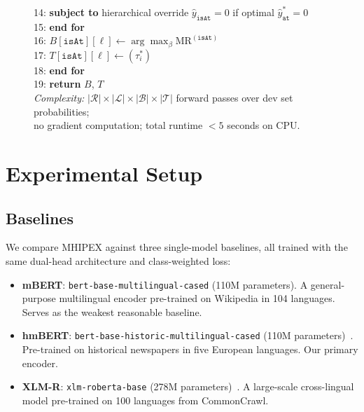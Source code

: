 \documentclass[11pt,a4paper]{article}
\begin{document}
\begin{figure}[t]
\begin{small}
\begin{tabbing}
14: \quad\quad \textbf{subject to} hierarchical override $\hat{y}_{\texttt{isAt}}=0$ if optimal $\hat{y}_{\texttt{at}}^*=0$ \\
15: \quad \textbf{end for} \\
16: \quad $B[\texttt{isAt}][\ell] \leftarrow \arg\max_\beta \text{MR}^{(\texttt{isAt})}$ \\
17: \quad $T[\texttt{isAt}][\ell] \leftarrow (\tau_i^*)$ \\
18: \textbf{end for} \\
19: \textbf{return} $B$, $T$ \\[4pt]
\emph{Complexity:} $|\mathcal{R}| \times |\mathcal{L}| \times |\mathcal{B}| \times |\mathcal{T}|$ forward passes over dev set probabilities; \\
\hspace{2.8em} no gradient computation; total runtime $< 5$ seconds on CPU.
\end{tabbing}
\end{small}
\end{figure}



\section{Experimental Setup}
\label{sec:setup}

\subsection{Baselines}

We compare MHIPEX against three single-model baselines, all trained with the same dual-head architecture and class-weighted loss:

\begin{itemize}
    \item \textbf{mBERT}: \texttt{bert-base-multilingual-cased} (110M parameters). A general-purpose multilingual encoder pre-trained on Wikipedia in 104 languages. Serves as the weakest reasonable baseline.
    \item \textbf{hmBERT}: \texttt{bert-base-historic-multilingual-cased} (110M parameters)~\cite{schweter2022}. Pre-trained on historical newspapers in five European languages. Our primary encoder.
    \item \textbf{XLM-R}: \texttt{xlm-roberta-base} (278M parameters)~\cite{conneau2020}. A large-scale cross-lingual model pre-trained on 100 languages from CommonCrawl.
\end{itemize}
\end{document}
